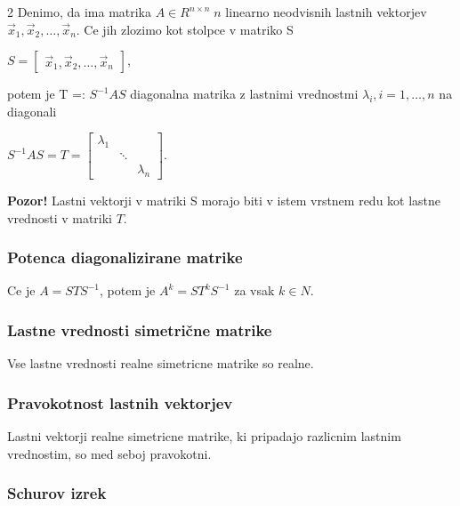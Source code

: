 \documentclass{article}
\begin{document}
\begin{multicols}{2}
	Denimo, da ima matrika $A \in R^{n \times n}\; n$ linearno neodvisnih lastnih vektorjev
	$\vec{x}_{1}, \vec{x}_{2}, \dots, \vec{x}_{n}$. Ce jih zlozimo kot stolpce v matriko S
	\begin{center}
		\begin{math}
			S =
			\begin{bmatrix}
				\vec{x}_{1}, \vec{x}_{2}, \dots, \vec{x}_{n}
			\end{bmatrix}
		\end{math},
	\end{center}
	potem je T =: $S^{-1}AS$ diagonalna matrika z lastnimi vrednostmi $\lambda_{i}, i = 1, \dots, n$ na diagonali
	\begin{center}
		\begin{math}
			S^{-1}AS = T =
			\begin{bmatrix}
				\lambda_{1} &        &             \\
				            & \ddots &             \\
				            &        & \lambda_{n}
			\end{bmatrix}
		\end{math}.
	\end{center}

	\textbf{Pozor!} Lastni vektorji v matriki S morajo biti v istem vrstnem redu kot lastne vrednosti v matriki $T$.

	\subsubsection{Potenca diagonalizirane matrike}

	Ce je $A = STS^{-1}$, potem je $A^{k} = ST^{k}S^{-1}$ za vsak $k \in N$.

	\subsubsection{Lastne vrednosti simetrične matrike}

	Vse lastne vrednosti realne simetricne matrike so realne.

	\subsubsection{Pravokotnost lastnih vektorjev}

	Lastni vektorji realne simetricne matrike, ki pripadajo razlicnim lastnim
	vrednostim, so med seboj pravokotni.

	\subsubsection{Schurov izrek}


\end{multicols}
\end{document}
